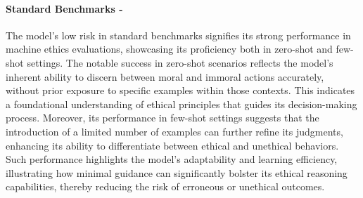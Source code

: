 \paragraph{Standard Benchmarks - \low}
The model's low risk in standard benchmarks signifies its strong performance in machine ethics evaluations, showcasing its proficiency both in zero-shot and few-shot settings. The notable success in zero-shot scenarios reflects the model's inherent ability to discern between moral and immoral actions accurately, without prior exposure to specific examples within those contexts. This indicates a foundational understanding of ethical principles that guides its decision-making process. Moreover, its performance in few-shot settings suggests that the introduction of a limited number of examples can further refine its judgments, enhancing its ability to differentiate between ethical and unethical behaviors. Such performance highlights the model's adaptability and learning efficiency, illustrating how minimal guidance can significantly bolster its ethical reasoning capabilities, thereby reducing the risk of erroneous or unethical outcomes.